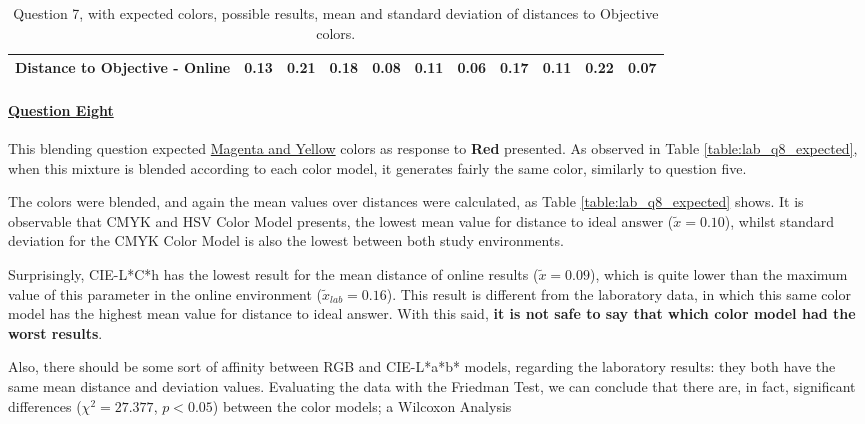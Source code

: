 \begin{table}[H]
{\begin{tabular}{lccccccccccccc}
    \multicolumn{4}{l}{Distance to Objective - Online}                                                                                               & \multicolumn{1}{|c}{0.13}        & \multicolumn{1}{c|}{0.21}    & \multicolumn{1}{|c}{0.18}        & \multicolumn{1}{c|}{0.08}    & \multicolumn{1}{|c}{\textbf{0.11}}       & \multicolumn{1}{c|}{0.06}    & \multicolumn{1}{|c}{0.17}        & \multicolumn{1}{c|}{0.11}    & \multicolumn{1}{|c}{0.22}       & \multicolumn{1}{c|}{0.07}    \\ \hline
    \end{tabular}}
  \caption[Question 7, with expected Results.]{Question 7, with expected colors, possible results, mean and standard deviation of distances to Objective colors.}
  \label{table:lab_q7_expected}
\end{table}
%
\paragraph{\ul{Question Eight}}
%
This blending question expected \ul{Magenta and Yellow} colors as response to \textbf{Red} presented. As observed in Table \ref{table:lab_q8_expected}, when this mixture is blended according
to each color model, it generates fairly the same color, similarly to question five. \par
%
The colors were blended, and again the mean values over distances were calculated, as Table \ref{table:lab_q8_expected} shows. It is observable that CMYK and HSV Color Model presents,
the lowest mean value for distance to ideal answer ($\tilde{x} = 0.10$), whilst standard deviation for the CMYK Color Model is also the lowest between both study environments. \par
%
Surprisingly, CIE-L*C*h has the lowest result for the mean distance of online results ($\tilde{x} = 0.09$), which is quite lower than the maximum value of this parameter in the online
environment ($\tilde{x}_{lab} = 0.16$). This result is different from the laboratory data, in which this same color model has the highest mean value for distance to ideal answer. With
this said, \textbf{it is not safe to say that which color model had the worst results}. \par
%
Also, there should be some sort of affinity between RGB and CIE-L*a*b* models, regarding the laboratory results: they both have the same mean distance and deviation values.
Evaluating the data with the Friedman Test, we can conclude that there are, in fact, significant differences ($\chi^2 = 27.377$, $p < 0.05$) between the color models; a Wilcoxon Analysis
